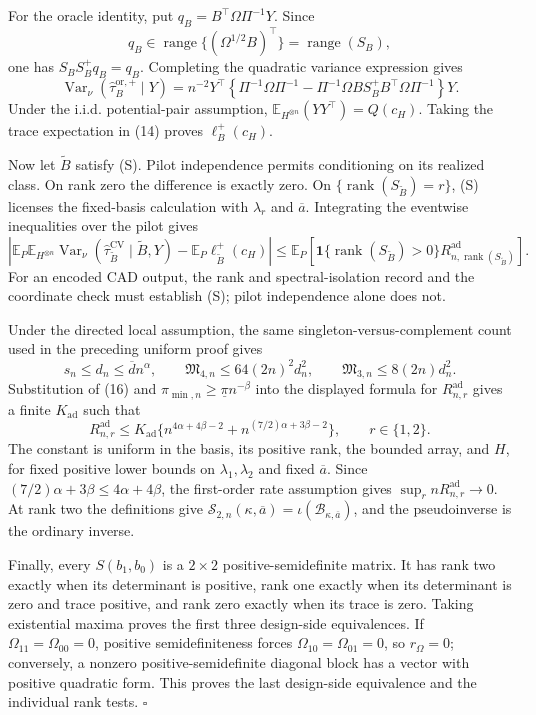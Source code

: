 For the oracle identity, put \(q_B=B^{\top}\Omega\Pi^{-1}Y\).  Since
\[
q_B\in\operatorname{range}\{(\Omega^{1/2}B)^{\top}\}
=\operatorname{range}(S_B),
\]
one has \(S_BS_B^+q_B=q_B\).  Completing the quadratic variance expression gives
\[
\operatorname{Var}_\nu(\widehat\tau_B^{\mathrm{or},+}\mid Y)
=n^{-2}Y^{\top}\left\{\Pi^{-1}\Omega\Pi^{-1}
-\Pi^{-1}\Omega BS_B^+B^{\top}\Omega\Pi^{-1}\right\}Y.
\tag{14}
\]
Under the i.i.d. potential-pair assumption, \(\mathbb E_{H^{\otimes n}}(YY^{\top})=Q(c_H)\).  Taking the trace expectation in (14) proves \(\ell_B^+(c_H)\).

Now let \(\widetilde B\) satisfy (S).  Pilot independence permits conditioning on its realized class.  On rank zero the difference is exactly zero.  On \(\{\operatorname{rank}(S_{\widetilde B})=r\}\), (S) licenses the fixed-basis calculation with \(\lambda_r\) and \(\overline a\).  Integrating the eventwise inequalities over the pilot gives
\[
\left|\mathbb E_P\mathbb E_{H^{\otimes n}}
\operatorname{Var}_\nu(\widehat\tau_{\widetilde B}^{\mathrm{CV}}\mid\widetilde B,Y)
-\mathbb E_P\ell_{\widetilde B}^+(c_H)\right|
\le\mathbb E_P\!\left[
\mathbf1\{\operatorname{rank}(S_{\widetilde B})>0\}
R_{n,\operatorname{rank}(S_{\widetilde B})}^{\mathrm{ad}}\right].
\tag{15}
\]
For an encoded CAD output, the rank and spectral-isolation record and the coordinate check must establish (S); pilot independence alone does not.

Under the directed local assumption, the same singleton-versus-complement count used in the preceding uniform proof gives
\[
s_n\le d_n\le\overline d n^\alpha,
\qquad
\mathfrak M_{4,n}\le64(2n)^2d_n^2,
\qquad
\mathfrak M_{3,n}\le8(2n)d_n^2.
\tag{16}
\]
Substitution of (16) and \(\pi_{\min,n}\ge\underline\pi n^{-\beta}\) into the displayed formula for \(R_{n,r}^{\mathrm{ad}}\) gives a finite \(K_{\mathrm{ad}}\) such that
\[
R_{n,r}^{\mathrm{ad}}
\le K_{\mathrm{ad}}\{n^{4\alpha+4\beta-2}
+n^{(7/2)\alpha+3\beta-2}\},
\qquad r\in\{1,2\}.
\tag{17}
\]
The constant is uniform in the basis, its positive rank, the bounded array, and \(H\), for fixed positive lower bounds on \(\lambda_1,\lambda_2\) and fixed \(\overline a\).  Since \((7/2)\alpha+3\beta\le4\alpha+4\beta\), the first-order rate assumption gives \(\sup_r nR_{n,r}^{\mathrm{ad}}\to0\).  At rank two the definitions give \(\mathcal S_{2,n}(\kappa,\overline a)=\iota(\mathcal B_{\kappa,\overline a})\), and the pseudoinverse is the ordinary inverse.

Finally, every \(S(b_1,b_0)\) is a \(2\times2\) positive-semidefinite matrix.  It has rank two exactly when its determinant is positive, rank one exactly when its determinant is zero and trace positive, and rank zero exactly when its trace is zero.  Taking existential maxima proves the first three design-side equivalences.  If \(\Omega_{11}=\Omega_{00}=0\), positive semidefiniteness forces \(\Omega_{10}=\Omega_{01}=0\), so \(r_\Omega=0\); conversely, a nonzero positive-semidefinite diagonal block has a vector with positive quadratic form.  This proves the last design-side equivalence and the individual rank tests. \(\square\)

